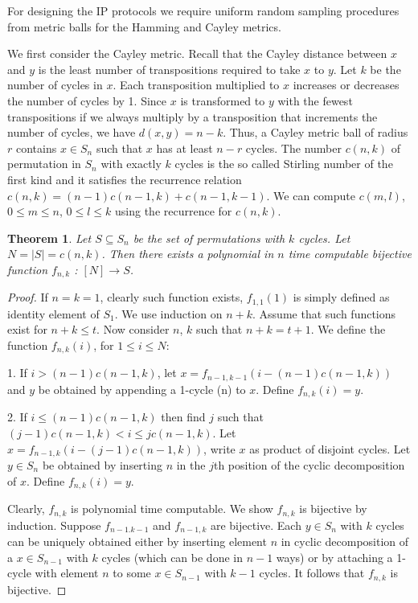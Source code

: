 \documentclass[12pt]{report}
\newtheorem{theorem}{Theorem}[section]
\begin{document}
For designing the IP protocols we require uniform random sampling procedures from metric balls for the Hamming and Cayley metrics.

We first consider the Cayley metric. Recall that the Cayley distance between $x$ and $y$ is the least number of transpositions required to take $x$ to $y$. Let $k$ be the number of cycles in $x$. Each transposition multiplied to $x$ increases or decreases the number of cycles by 1. Since $x$ is transformed to $y$ with the fewest transpositions if we always multiply by a transposition that increments the number of cycles, we have $d(x, y) = n - k$. Thus, a Cayley metric ball of radius $r$ contains $x \in S_n$ such that $x$ has at least $n - r$ cycles. The number $c(n, k)$ of permutation in $S_n$ with exactly $k$ cycles is the so called Stirling number of the first kind and it satisfies the recurrence relation $c(n, k) = (n - 1)c(n - 1, k) + c(n - 1, k - 1)$. We can compute $c(m, l)$, $0 \leq m \leq n$, $0 \leq l \leq k$ using the recurrence for $c(n, k)$.

\begin{theorem}
	Let $S \subseteq S_n$ be the set of permutations with $k$ cycles. Let $N = |S| = c(n, k)$. Then there exists a polynomial in $n$ time computable bijective function $f_{n, k}$ : $[N] \rightarrow S$.
\end{theorem}
\begin{proof}
	If $n = k = 1$, clearly such function exists, $f_{1, 1}(1)$ is simply defined as identity element of $S_1$. We use induction on $n + k$. Assume that such functions exist for $n + k \leq t$. Now consider $n$, $k$ such that $n + k = t + 1$. We define the function $f_{n, k}(i)$, for $1 \leq i \leq N$:
	
	1. If $i > (n - 1)c(n - 1, k)$, let $x = f_{n - 1, k - 1}(i - (n - 1)c(n - 1, k))$ and $y$ be obtained by appending a 1-cycle (n) to $x$. Define $f_{n, k}(i) = y$.
	
	2. If $i \leq (n - 1)c(n - 1, k)$ then find $j$ such that $(j - 1)c(n - 1, k) < i \leq jc(n - 1, k)$.
	Let $x = f_{n - 1, k}(i - (j - 1)c(n - 1, k))$, write $x$ as product of disjoint cycles. Let $y \in S_n$ be obtained by inserting $n$ in the $j$th position of the cyclic decomposition of $x$. Define $f_{n, k}(i) = y$.
	
	Clearly, $f_{n, k}$ is polynomial time computable. We show $f_{n, k}$ is bijective by induction.
	Suppose $f_{n - 1. k - 1}$ and $f_{n - 1, k}$ are bijective. Each $y \in S_n$ with $k$ cycles can be uniquely obtained either by inserting element $n$ in cyclic decomposition of a $x \in S_{n - 1}$ with $k$ cycles (which can be done in $n - 1$ ways) or by attaching a 1-cycle with element $n$ to some $x \in S_{n - 1}$ with $k - 1$ cycles. It follows that $f_{n, k}$ is bijective.
\end{proof}
\end{document}
